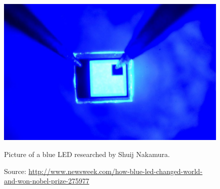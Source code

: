 \begin{figure}[!h]
\centering
\includegraphics{./0_intro/img/10-7-14-nobel-prize-blue-led.jpg}
\label{fig:blue_LED}
\caption{Picture of a blue LED researched by Shuij Nakamura.}
\caption*{Source: \url{http://www.newsweek.com/how-blue-led-changed-world-and-won-nobel-prize-275977} }
\end{figure}

